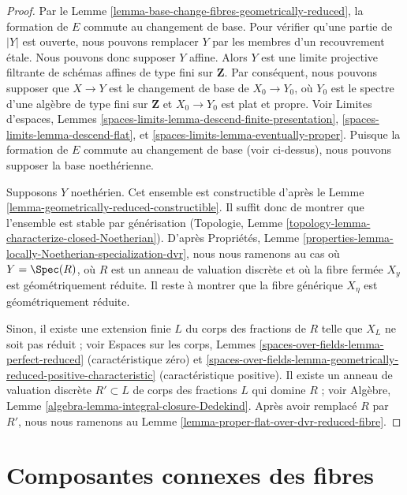 \begin{proof}
Par le Lemme \ref{lemma-base-change-fibres-geometrically-reduced},
la formation de $E$ commute au changement de base. Pour vérifier qu'une partie
de $|Y|$ est ouverte, nous pouvons remplacer $Y$ par les membres d'un
recouvrement étale. Nous pouvons donc supposer $Y$ affine.
Alors $Y$ est une limite projective filtrante de schémas
affines de type fini sur $\mathbf{Z}$.
Par conséquent, nous pouvons supposer que $X \to Y$ est le
changement de base de $X_0 \to Y_0$, où $Y_0$ est le spectre d'une algèbre
de type fini sur $\mathbf{Z}$ et $X_0 \to Y_0$ est plat et propre.
Voir Limites d'espaces, Lemmes
\ref{spaces-limits-lemma-descend-finite-presentation},
\ref{spaces-limits-lemma-descend-flat}, et
\ref{spaces-limits-lemma-eventually-proper}. Puisque la formation de
$E$ commute au changement de base (voir ci-dessus),
nous pouvons supposer la base noethérienne.

\medskip\noindent
Supposons $Y$ noethérien. Cet ensemble est constructible d'après le
Lemme \ref{lemma-geometrically-reduced-constructible}.
Il suffit donc de montrer que l'ensemble est stable par générisation
(Topologie, Lemme \ref{topology-lemma-characterize-closed-Noetherian}). D'après
Propriétés, Lemme \ref{properties-lemma-locally-Noetherian-specialization-dvr},
nous nous ramenons au cas où $Y = \Spec(R)$, où $R$ est un anneau de
valuation discrète et où la fibre fermée $X_y$ est géométriquement
réduite. Il reste à montrer que la fibre générique $X_\eta$ est géométriquement réduite.

\medskip\noindent
Sinon, il existe une extension finie $L$ du corps des
fractions de $R$ telle que $X_L$ ne soit pas réduit ; voir
Espaces sur les corps, Lemmes
\ref{spaces-over-fields-lemma-perfect-reduced} (caractéristique zéro) et
\ref{spaces-over-fields-lemma-geometrically-reduced-positive-characteristic}
(caractéristique positive). Il existe un anneau de valuation discrète
$R' \subset L$ de corps des fractions $L$ qui domine $R$ ; voir
Algèbre, Lemme \ref{algebra-lemma-integral-closure-Dedekind}.
Après avoir remplacé $R$ par $R'$, nous nous ramenons au
Lemme \ref{lemma-proper-flat-over-dvr-reduced-fibre}.
\end{proof}







\section{Composantes connexes des fibres}
\label{section-connected}

